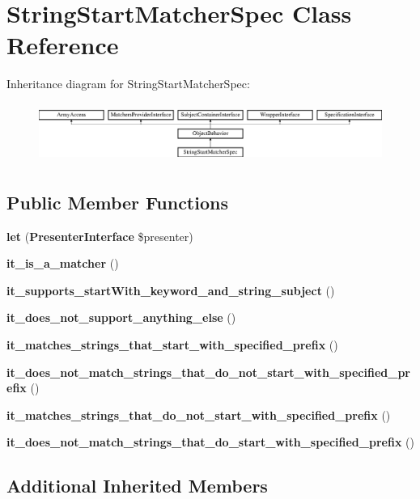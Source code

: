 \section{String\+Start\+Matcher\+Spec Class Reference}
\label{classspec_1_1_php_spec_1_1_matcher_1_1_string_start_matcher_spec}
Inheritance diagram for String\+Start\+Matcher\+Spec\+:\begin{figure}[H]
\begin{center}
\leavevmode
\includegraphics[height=1.953488cm]{classspec_1_1_php_spec_1_1_matcher_1_1_string_start_matcher_spec}
\end{center}
\end{figure}
\subsection*{Public Member Functions}
\begin{DoxyCompactItemize}
\item 
{\bf let} ({\bf Presenter\+Interface} \$presenter)
\item 
{\bf it\+\_\+is\+\_\+a\+\_\+matcher} ()
\item 
{\bf it\+\_\+supports\+\_\+start\+With\+\_\+keyword\+\_\+and\+\_\+string\+\_\+subject} ()
\item 
{\bf it\+\_\+does\+\_\+not\+\_\+support\+\_\+anything\+\_\+else} ()
\item 
{\bf it\+\_\+matches\+\_\+strings\+\_\+that\+\_\+start\+\_\+with\+\_\+specified\+\_\+prefix} ()
\item 
{\bf it\+\_\+does\+\_\+not\+\_\+match\+\_\+strings\+\_\+that\+\_\+do\+\_\+not\+\_\+start\+\_\+with\+\_\+specified\+\_\+prefix} ()
\item 
{\bf it\+\_\+matches\+\_\+strings\+\_\+that\+\_\+do\+\_\+not\+\_\+start\+\_\+with\+\_\+specified\+\_\+prefix} ()
\item 
{\bf it\+\_\+does\+\_\+not\+\_\+match\+\_\+strings\+\_\+that\+\_\+do\+\_\+start\+\_\+with\+\_\+specified\+\_\+prefix} ()
\end{DoxyCompactItemize}
\subsection*{Additional Inherited Members}


